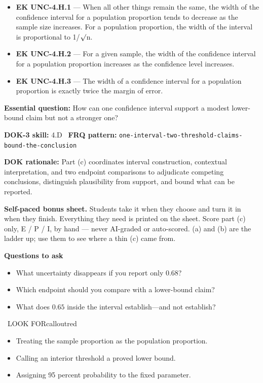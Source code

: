 \documentclass[11pt]{article}
\begin{document}
{\begin{itemize}[leftmargin=1.5em,itemsep=2pt,topsep=2pt]
  \item \textbf{EK UNC-4.H.1} --- When all other things remain the same, the width of the confidence interval for a population proportion tends to decrease as the sample size increases. For a population proportion, the width of the interval is proportional to 1/$\surd$n.
  \item \textbf{EK UNC-4.H.2} --- For a given sample, the width of the confidence interval for a population proportion increases as the confidence level increases.
  \item \textbf{EK UNC-4.H.3} --- The width of a confidence interval for a population proportion is exactly twice the margin of error.
\end{itemize}
}
\textbf{Essential question:} How can one confidence interval support a modest lower-bound claim but not a stronger one?\par
\textbf{DOK-3 skill:} 4.D \textperiodcentered\ \textbf{FRQ pattern:} {\small\texttt{one-\allowbreak{}interval-\allowbreak{}two-\allowbreak{}threshold-\allowbreak{}claims-\allowbreak{}bound-\allowbreak{}the-\allowbreak{}conclusion}}\par
\textbf{DOK rationale:} Part (c) coordinates interval construction, contextual interpretation, and two endpoint comparisons to adjudicate competing conclusions, distinguish plausibility from support, and bound what can be reported.\par

\textbf{Self-paced bonus sheet.} Students take it when they choose and turn it in when they finish. Everything they need is printed on the sheet. Score part (c) only, E / P / I, by hand --- never AI-graded or auto-scored. (a) and (b) are the ladder up; use them to see where a thin (c) came from.\par

\textbf{Questions to ask}
\begin{itemize}[leftmargin=1.5em,itemsep=2pt,topsep=2pt]
  \item What uncertainty disappears if you report only $0.68$?
  \item Which endpoint should you compare with a lower-bound claim?
  \item What does $0.65$ inside the interval establish---and not establish?
\end{itemize}

\begin{callout}{\IconWarn\ LOOK FOR}{calloutred}
\begin{itemize}[leftmargin=1.5em,itemsep=2pt,topsep=2pt]
  \item Treating the sample proportion as the population proportion.
  \item Calling an interior threshold a proved lower bound.
  \item Assigning 95 percent probability to the fixed parameter.
\end{itemize}
\end{callout}
\end{document}
